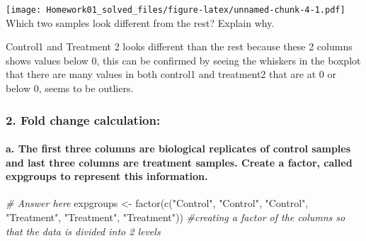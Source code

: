 \documentclass[
]{article}
\newenvironment{Shaded}{\begin{snugshade}}{\end{snugshade}}
\newcommand{\CommentTok}[1]{\textcolor[rgb]{0.56,0.35,0.01}{\textit{#1}}}
\newcommand{\FunctionTok}[1]{\textcolor[rgb]{0.00,0.00,0.00}{#1}}
\newcommand{\NormalTok}[1]{#1}
\newcommand{\OtherTok}[1]{\textcolor[rgb]{0.56,0.35,0.01}{#1}}
\newcommand{\StringTok}[1]{\textcolor[rgb]{0.31,0.60,0.02}{#1}}
\begin{document}
\texttt{[image: Homework01\_solved\_files/figure-latex/unnamed-chunk-4-1.pdf]}
Which two samples look different from the rest? Explain why.

Control1 and Treatment 2 looks different than the rest because these 2
columns shows values below 0, this can be confirmed by seeing the
whiskers in the boxplot that there are many values in both control1 and
treatment2 that are at 0 or below 0, seems to be outliers.

\hypertarget{fold-change-calculation}{%
\subsubsection{2. Fold change
calculation:}\label{fold-change-calculation}}

\hypertarget{a.-the-first-three-columns-are-biological-replicates-of-control-samples-and-last-three-columns-are-treatment-samples.-create-a-factor-called-expgroups-to-represent-this-information.}{%
\paragraph{\texorpdfstring{a. The first three columns are biological
replicates of \textbf{control} samples and last three columns are
\textbf{treatment} samples. Create a factor, called \textbf{expgroups}
to represent this
information.}{a. The first three columns are biological replicates of control samples and last three columns are treatment samples. Create a factor, called expgroups to represent this information.}}\label{a.-the-first-three-columns-are-biological-replicates-of-control-samples-and-last-three-columns-are-treatment-samples.-create-a-factor-called-expgroups-to-represent-this-information.}}

\begin{Shaded}
\begin{Highlighting}[]
\CommentTok{\# Answer here}
\NormalTok{expgroups }\OtherTok{\textless{}{-}} \FunctionTok{factor}\NormalTok{(}\FunctionTok{c}\NormalTok{(}\StringTok{"Control"}\NormalTok{, }\StringTok{"Control"}\NormalTok{, }\StringTok{"Control"}\NormalTok{, }\StringTok{"Treatment"}\NormalTok{, }\StringTok{"Treatment"}\NormalTok{, }\StringTok{"Treatment"}\NormalTok{)) }\CommentTok{\#creating a factor of the columns so that the data is divided into 2 levels}
\end{Highlighting}
\end{Shaded}
\end{document}
